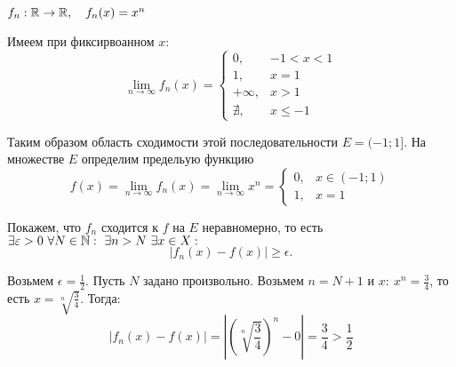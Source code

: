 \begin{example}
    $f_n: \mathbb{R}\rightarrow\mathbb{R}, \quad f_n(x) = x^n$

    Имеем при фиксирвоанном $x$:
    \[
        \underset{n\rightarrow\infty}{\lim}f_n(x) = \left\{\begin{array}{rl}
            0,        & -1 < x < 1     \\
            1,        & x = 1          \\
            + \infty, & x > 1          \\
            \nexists, & x \leqslant -1
        \end{array}\right.
    \]

    Таким образом область сходимости этой последовательности $E = (-1;1]$. На множестве $E$ определим предельую функцию
    \[
        f(x) = \underset{n\rightarrow\infty}{\lim}f_n(x) = \underset{n\rightarrow\infty}{\lim}x^n = \left\{\begin{array}{rl}
            0, & x \in (-1;1) \\
            1, & x = 1
        \end{array}\right.
    \]

    Покажем, что $f_n$ сходится к $f$ на $E$ неравномерно, то есть $\exists \varepsilon > 0 \ \forall N \in \mathbb{N}: \ \exists n > N \ \exists x \in X:$
    \[
        \big|f_n(x) - f(x)\big| \geqslant \epsilon.
    \]

    Возьмем $\epsilon = \frac{1}{2}$. Пусть $N$ задано произвольно. Возьмем $n = N + 1$ и $x: \ x^n = \frac{3}{4}$, то есть $x = \sqrt[n]{\frac{3}{4}}$. Тогда:
    \[
        \big|f_n(x) - f(x)\big| = \left|\left(\sqrt[n]{\frac{3}{4}}\right)^n - 0\right| = \frac{3}{4} > \frac{1}{2}
    \]
\end{example}

